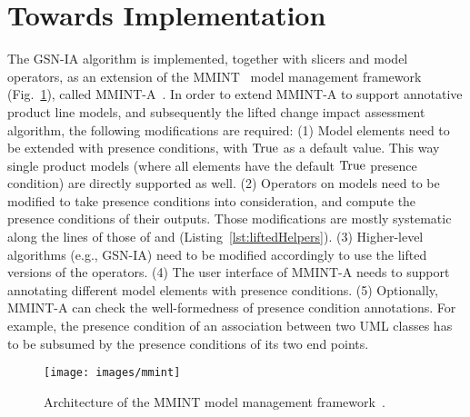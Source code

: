 \vspace{-0.1in}
\section{Towards Implementation}
\label{sec:impl}
\vspace{-0.1in}

The GSN-IA algorithm is implemented, together with slicers and model operators, as an extension of the MMINT~\cite{DiSandro:2015} model management framework (Fig.~\ref{fig:mmint}), called MMINT-A~\cite{Fung:2018}. In order to extend MMINT-A to support annotative product line models, and subsequently the lifted change impact assessment algorithm, the following modifications are required:
(1) Model elements need to be extended with presence conditions, with $\text{True}$ as a default value.   This way single product models (where all elements have the default $\text{True}$ presence condition) are directly supported as well.
(2) Operators on models need to be modified to take presence conditions into consideration, and compute the presence conditions of their outputs. Those modifications are mostly systematic along the lines of those of \lift{\restrict} and \lift{\trace} (Listing~\ref{lst:liftedHelpers}). 
(3) Higher-level algorithms (e.g., GSN-IA) need to be modified accordingly to use the lifted versions of the operators.
(4) The user interface of MMINT-A needs to support annotating different model elements with presence conditions.
(5) Optionally, MMINT-A can check the well-formedness of presence condition annotations. For example, the presence condition of an association between two UML classes has to be subsumed by the presence conditions of its two end points.

\begin{figure}[t]
	\texttt{[image: images/mmint]}	
	\vspace{-0.2in}
	\caption{Architecture of the MMINT model management framework~\cite{Fung:2018}.}
	\label{fig:mmint}	
	\vspace{-0.2in}
\end{figure}